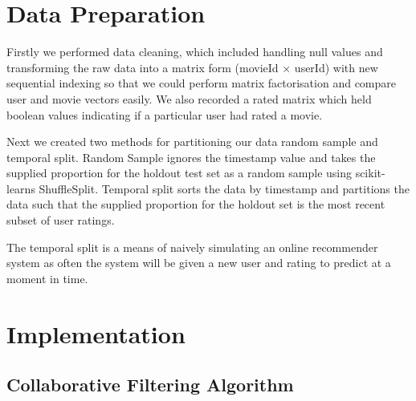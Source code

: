 \documentclass[10pt]{article}
\begin{document}
%



\section{Data Preparation}
Firstly we performed data cleaning, which included handling null values and transforming the raw data into a matrix form (movieId $\times$ userId) with new sequential indexing so that we could perform matrix factorisation and compare user and movie vectors easily. We also recorded a rated matrix which held boolean values indicating if a particular user had rated a movie.

Next we created two methods for partitioning our data random sample and temporal split. Random Sample ignores the timestamp value and takes the supplied proportion for the holdout test set as a random sample using scikit-learns ShuffleSplit. Temporal split sorts the data by timestamp and partitions the data such that the supplied proportion for the holdout set is the most recent subset of user ratings. 

The temporal split is a means of naively simulating an online recommender system as often the system will be given a new user and rating to predict at a moment in time.

\section{Implementation}


\subsection{Collaborative Filtering Algorithm}
\end{document}
